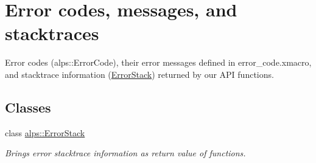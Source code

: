 \hypertarget{group__ERRORCODES}{}\section{Error codes, messages, and stacktraces}
\label{group__ERRORCODES}


Error codes (alps\+::\+Error\+Code), their error messages defined in error\+\_\+code.\+xmacro, and stacktrace information (\hyperlink{classalps_1_1ErrorStack}{Error\+Stack}) returned by our A\+PI functions.  


\subsection*{Classes}
\begin{DoxyCompactItemize}
\item 
class \hyperlink{classalps_1_1ErrorStack}{alps\+::\+Error\+Stack}
\begin{DoxyCompactList}\small\item\em Brings error stacktrace information as return value of functions. \end{DoxyCompactList}\end{DoxyCompactItemize}
